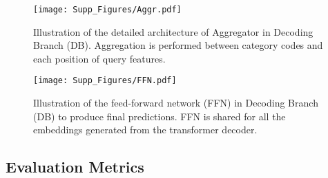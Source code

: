 \documentclass[10pt,twocolumn,letterpaper]{article}
\begin{document}
\begin{figure}[t!] 
\begin{center}
   \texttt{[image: Supp\_Figures/Aggr.pdf]}
\end{center}
\vspace*{-1.8mm}
   \caption{Illustration of the detailed architecture of Aggregator in Decoding Branch (DB). Aggregation is performed between category codes and each position of query features.}
\label{fig:supp_aggr}
\vspace*{+3.5mm}
\end{figure}


\begin{figure}[t] 
\begin{center}
   \texttt{[image: Supp\_Figures/FFN.pdf]}
\end{center}
\vspace*{-1.8mm}
   \caption{Illustration of the feed-forward network (FFN) in Decoding Branch (DB) to produce final predictions. FFN is shared for all the embeddings generated from the transformer decoder.}
\label{fig:supp_ffn}
\vspace*{+3.5mm}
\end{figure}




\begin{table}
\begin{center}
\end{center}
\vspace*{-1.2mm}
\caption{Setups of total number of epochs and learning rate decay epochs for the few-shot fine-tuning stage.}
\label{tab:appendix_ftepochs}
\vspace*{+3.5mm}
\end{table} 


\subsection{Evaluation Metrics}
\end{document}
